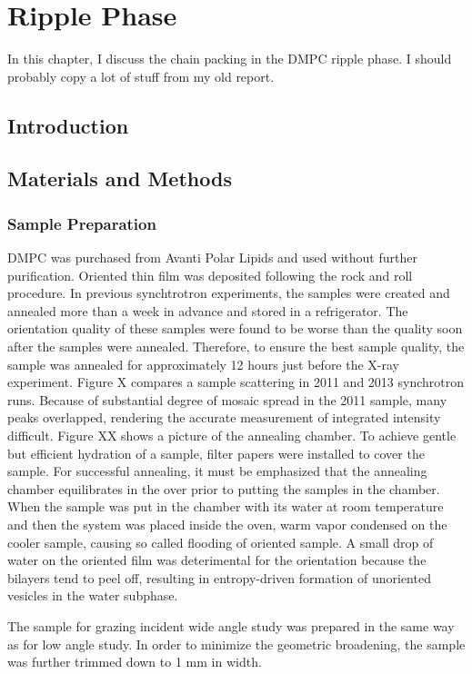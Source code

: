 \chapter{Ripple Phase}
In this chapter, I discuss the chain packing in the DMPC ripple phase. 
I should probably copy a lot of stuff from my old report.

\section{Introduction}

\section{Materials and Methods}
\subsection{Sample Preparation}
DMPC was purchased from Avanti Polar Lipids and used without further purification.
Oriented thin film was deposited following the rock and roll procedure.  
In previous synchtrotron experiments, the samples were created and annealed 
more than a week in advance and stored in a refrigerator. The orientation
quality of these samples were found to be worse than the quality soon after
the samples were annealed. Therefore, to ensure the best sample quality, the 
sample was annealed for approximately 12 hours just before the X-ray experiment.
Figure X compares a sample scattering in 2011 and 2013 synchrotron runs. 
Because of substantial degree of mosaic spread in the 2011 sample, many peaks
overlapped, rendering the accurate measurement of integrated intensity difficult.
Figure XX shows a picture of the annealing chamber. To achieve gentle but
efficient hydration of a sample, filter papers were installed to cover the 
sample. For successful annealing, it must be emphasized that the annealing 
chamber equilibrates in the over prior to putting the samples in the chamber.
When the sample was put in the chamber with its water at room temperature and
then the system was placed inside the oven, warm vapor condensed on the cooler
sample, causing so called flooding of oriented sample. A small drop of water
on the oriented film was deterimental for the orientation because the bilayers
tend to peel off, resulting in entropy-driven formation of unoriented vesicles 
in the water subphase. 

The sample for grazing incident wide angle study was prepared in the same way 
as for low angle study. In order to minimize the geometric broadening, the 
sample was further trimmed down to 1 mm in width.

